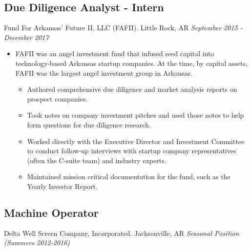 \documentclass[11pt]{article}
\begin{document}
\subsection*{Due Diligence Analyst - Intern}
Fund For Arkansas' Future II, LLC (FAFII). Little Rock, AR \hfill \textit{September 2015 - December 2017} \\
\begin{itemize}
\item FAFII was an angel investment fund that infused seed capital into technology-based Arkansas startup companies. At the time, by capital assets, FAFII was the largest angel investment group in Arkansas.
 \begin{itemize}
  \item Authored comprehensive due diligence and market analysis reports on prospect companies.
  \item Took notes on company investment pitches and used those notes to help form questions for due diligence research.
  \item Worked directly with the Executive Director and Investment Committee to conduct follow-up interviews with startup company representatives (often the C-suite team) and industry experts.
  \item Maintained mission critical documentation for the fund, such as the Yearly Investor Report.
 \end{itemize}
\end{itemize}

\subsection*{Machine Operator}
Delta Well Screen Company, Incorporated. Jacksonville, AR \hfill \textit{Seasonal Position (Summers 2012-2016)} \\
\end{document}
